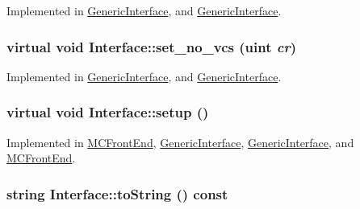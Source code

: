 Implemented in \hyperlink{classGenericInterface_d4d5041bce12cd013a77f476c039c391}{GenericInterface}, and \hyperlink{classGenericInterface_d4d5041bce12cd013a77f476c039c391}{GenericInterface}.\hypertarget{classInterface_e7266de6cc9e1dfd4bb3a1b8face3c15}{
\subsubsection[{set\_\-no\_\-vcs}]{\setlength{\rightskip}{0pt plus 5cm}virtual void Interface::set\_\-no\_\-vcs ({\bf uint} {\em cr})}}
\label{classInterface_e7266de6cc9e1dfd4bb3a1b8face3c15}




Implemented in \hyperlink{classGenericInterface_10e019a3cafe243d63587656afc5e79f}{GenericInterface}, and \hyperlink{classGenericInterface_10e019a3cafe243d63587656afc5e79f}{GenericInterface}.\hypertarget{classInterface_f9015204e6dabe3e0fce572b19cd1550}{
\subsubsection[{setup}]{\setlength{\rightskip}{0pt plus 5cm}virtual void Interface::setup ()}}
\label{classInterface_f9015204e6dabe3e0fce572b19cd1550}




Implemented in \hyperlink{classMCFrontEnd_5f399666cb967c146570e81372fe6be6}{MCFrontEnd}, \hyperlink{classGenericInterface_1aaf2e40e433e913e7ea9cb68693fa7c}{GenericInterface}, \hyperlink{classGenericInterface_1aaf2e40e433e913e7ea9cb68693fa7c}{GenericInterface}, and \hyperlink{classMCFrontEnd_5f399666cb967c146570e81372fe6be6}{MCFrontEnd}.\hypertarget{classInterface_137cdb3bca46eb2ae0bbf017d1efb66e}{
\subsubsection[{toString}]{\setlength{\rightskip}{0pt plus 5cm}string Interface::toString () const}}
\label{classInterface_137cdb3bca46eb2ae0bbf017d1efb66e}





